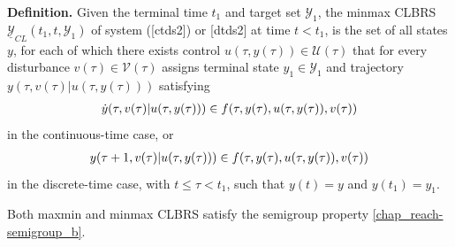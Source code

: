 \documentclass[letterpaper,10pt,english]{sphinxmanual}
\begin{document}
\textbf{Definition.} Given the terminal time $t_1$ and target set ${\mathcal Y}_1$, the
minmax CLBRS $\underline{{\mathcal Y}}_{CL}(t_1, t, {\mathcal Y}_1)$ of system
({[}ctds2{]}) or {[}dtds2{]} at time $t<t_1$, is the set of all states
$y$, for each of which there exists control
$u(\tau, y(\tau))\in{\mathcal U}(\tau)$ that for every disturbance
$v(\tau)\in{\mathcal V}(\tau)$ assigns terminal state
$y_1\in{\mathcal Y}_1$ and trajectory
$y(\tau, v(\tau) | u(\tau, y(\tau)))$ satisfying
\begin{gather}
\begin{split}\dot{y}(\tau, v(\tau) | u(\tau, y(\tau))) \in
f(\tau, y(\tau), u(\tau, y(\tau)), v(\tau))\end{split}\notag
\end{gather}
in the continuous-time case, or
\begin{gather}
\begin{split}y(\tau+1, v(\tau) | u(\tau, y(\tau))) \in
f(\tau, y(\tau), u(\tau, y(\tau)), v(\tau))\end{split}\notag
\end{gather}
in the discrete-time case, with $t\leqslant\tau<t_1$, such that
$y(t) = y$ and $y(t_1)=y_1$.

Both
maxmin and minmax CLBRS satisfy the semigroup property
\eqref{chap_reach-semigroup_b}.
\end{document}

